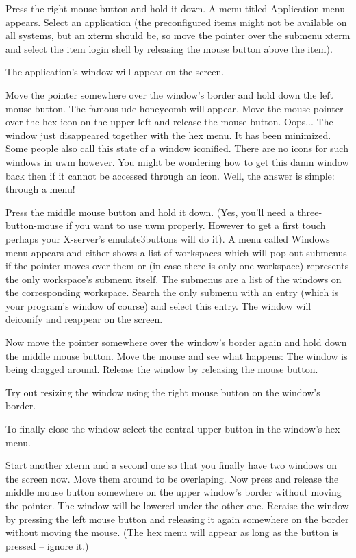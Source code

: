 \documentclass[10pt,a4paper]{article}
\newcommand{\uwm}{{\sc uwm} }
\begin{document}
Press the right mouse button and hold it down. A menu titled \textsf{Application menu} appears. Select an application (the preconfigured items might not be available on all systems, but an xterm should be, so move the pointer over the submenu \textsf{xterm} and select the item \textsf{login shell} by releasing the mouse button above the item).

The application's window will appear on the screen. 

Move the pointer somewhere over the window's border and hold down the left mouse button. The famous ude honeycomb will appear. Move the mouse pointer over the hex-icon on the upper left and release the mouse button. Oops... The window just disappeared together with the hex menu. It has been minimized. Some people also call this state of a window iconified. There are no icons for such windows in \uwm however. You might be wondering how to get this damn window back then if it cannot be accessed through an icon. Well, the answer is simple: through a menu!

Press the middle mouse button and hold it down. (Yes, you'll need a three-button-mouse if you want to use \uwm properly. However to get a first touch perhaps your X-server's \textsf{emulate3buttons} will do it). A menu called \textsf{Windows menu} appears and either shows a list of workspaces which will pop out submenus if the pointer moves over them or (in case there is only one workspace) represents the only workspace's submenu itself. The submenus are a list of the windows on the corresponding workspace. Search the only submenu with an entry (which is your program's window of course) and select this entry. The window will deiconify and reappear on the screen.

Now move the pointer somewhere over the window's border again and hold down the middle mouse button. Move the mouse and see what happens: The window is being dragged around. Release the window by releasing the mouse button.

Try out resizing the window using the right mouse button on the window's border.

To finally close the window select the central upper button in the window's hex-menu.

Start another xterm and a second one so that you finally have two windows on the screen now. Move them around to be overlaping. Now press and release the middle mouse button somewhere on the upper window's border without moving the pointer. The window will be lowered under the other one. Reraise the window by pressing the left mouse button and releasing it again somewhere on the border without moving the mouse. (The hex menu will appear as long as the button is pressed -- ignore it.)
\end{document}
